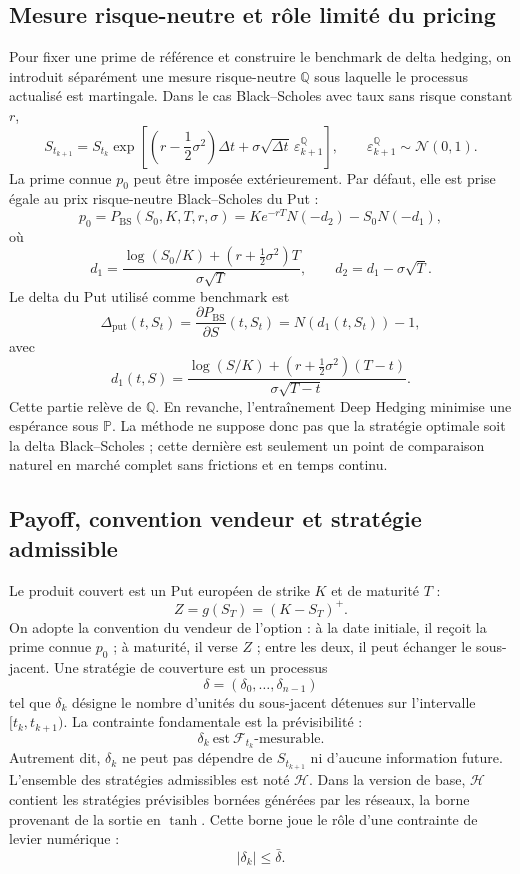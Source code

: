 \documentclass[11pt,a4paper]{article}
\begin{document}
\subsection{Mesure risque-neutre et rôle limité du pricing}

Pour fixer une prime de référence et construire le benchmark de delta hedging,
on introduit séparément une mesure risque-neutre $\mathbb{Q}$ sous laquelle le
processus actualisé est martingale. Dans le cas Black--Scholes avec taux sans
risque constant $r$,
\[
S_{t_{k+1}}
=S_{t_k}\exp\left[
\left(r-\frac12\sigma^2\right)\Delta t
+\sigma\sqrt{\Delta t}\,\varepsilon^{\mathbb{Q}}_{k+1}
\right],
\qquad
\varepsilon^{\mathbb{Q}}_{k+1}\sim\mathcal{N}(0,1).
\]
La prime connue $p_0$ peut être imposée extérieurement. Par défaut, elle est
prise égale au prix risque-neutre Black--Scholes du Put :
\[
p_0=P_{\mathrm{BS}}(S_0,K,T,r,\sigma)
=Ke^{-rT}N(-d_2)-S_0N(-d_1),
\]
où
\[
d_1=\frac{\log(S_0/K)+(r+\frac12\sigma^2)T}{\sigma\sqrt{T}},
\qquad
d_2=d_1-\sigma\sqrt{T}.
\]
Le delta du Put utilisé comme benchmark est
\[
\Delta_{\mathrm{put}}(t,S_t)
=\frac{\partial P_{\mathrm{BS}}}{\partial S}(t,S_t)
=N(d_1(t,S_t))-1,
\]
avec
\[
d_1(t,S)
=\frac{\log(S/K)+(r+\frac12\sigma^2)(T-t)}
{\sigma\sqrt{T-t}}.
\]
Cette partie relève de $\mathbb{Q}$. En revanche, l'entraînement Deep Hedging
minimise une espérance sous $\mathbb{P}$. La méthode ne suppose donc pas que
la stratégie optimale soit la delta Black--Scholes ; cette dernière est seulement
un point de comparaison naturel en marché complet sans frictions et en temps
continu.

\subsection{Payoff, convention vendeur et stratégie admissible}

Le produit couvert est un Put européen de strike $K$ et de maturité $T$ :
\[
Z=g(S_T)=(K-S_T)^+.
\]
On adopte la convention du vendeur de l'option : à la date initiale, il reçoit
la prime connue $p_0$ ; à maturité, il verse $Z$ ; entre les deux, il peut
échanger le sous-jacent. Une stratégie de couverture est un processus
\[
\delta=(\delta_0,\ldots,\delta_{n-1})
\]
tel que $\delta_k$ désigne le nombre d'unités du sous-jacent détenues sur
l'intervalle $[t_k,t_{k+1})$. La contrainte fondamentale est la prévisibilité :
\[
\delta_k\ \text{est}\ \mathcal{F}_{t_k}\text{-mesurable}.
\]
Autrement dit, $\delta_k$ ne peut pas dépendre de $S_{t_{k+1}}$ ni d'aucune
information future. L'ensemble des stratégies admissibles est noté
$\mathcal{H}$. Dans la version de base, $\mathcal{H}$ contient les stratégies
prévisibles bornées générées par les réseaux, la borne provenant de la sortie
en $\tanh$. Cette borne joue le rôle d'une contrainte de levier numérique :
\[
|\delta_k|\leq \bar{\delta}.
\]
\end{document}
